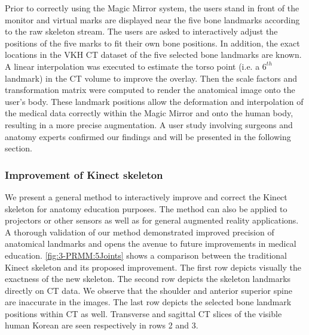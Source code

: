 Prior to correctly using the Magic Mirror system, the users stand in front of the monitor and virtual marks are displayed near the five bone landmarks according to the raw skeleton stream. The users are asked to interactively adjust the positions of the five marks to fit their own bone positions. In addition, the exact locations in the VKH CT dataset of the five selected bone landmarks are known. A linear interpolation was executed to estimate the torso point (i.e. a $6^{th}$ landmark) in the CT volume to improve the overlay. Then the scale factors and transformation matrix were computed to render the anatomical image onto the user's body. These landmark positions allow the deformation and interpolation of the medical data correctly within the Magic Mirror and onto the human body, resulting in a more precise augmentation. A user study involving surgeons and anatomy experts confirmed our findings and will be presented in the following section.

\subsubsection{Improvement of Kinect skeleton}
We present a general method to interactively improve and correct the Kinect skeleton for anatomy education purposes. The method can also be applied to projectors or other sensors as well as for general augmented reality applications. A thorough validation of our method demonstrated improved precision of anatomical landmarks and opens the avenue to future improvements in medical education. 
\figurename{\ref{fig:3-PRMM:5Joints}} shows a comparison between the traditional Kinect skeleton and its proposed improvement. The first row depicts visually the exactness of the new skeleton. The second row depicts the skeleton landmarks directly on CT data. We observe that the shoulder and anterior superior spine are inaccurate in the images. The last row depicts the selected bone landmark positions within CT as well. Transverse and sagittal CT slices of the visible human Korean are seen respectively in rows 2 and 3.

